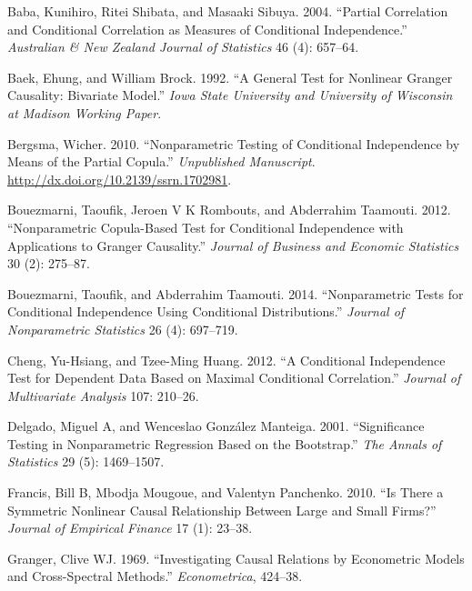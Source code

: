 \documentclass[
  12pt,
  letterpaper]{article}
\newlength{\cslhangindent}
\newenvironment{cslreferences}%
  {\setlength{\parindent}{0pt}%
  \everypar{\setlength{\hangindent}{\cslhangindent}}\ignorespaces}%
  {\par}
\theoremstyle{definition}
\theoremstyle{definition}
\theoremstyle{definition}
\theoremstyle{remark}
\begin{document}
\hypertarget{refs}{}
\begin{cslreferences}
\leavevmode\hypertarget{ref-baba2004partial}{}%
Baba, Kunihiro, Ritei Shibata, and Masaaki Sibuya. 2004. ``Partial Correlation and Conditional Correlation as Measures of Conditional Independence.'' \emph{Australian \& New Zealand Journal of Statistics} 46 (4): 657--64.

\leavevmode\hypertarget{ref-baek:broc:1992}{}%
Baek, Ehung, and William Brock. 1992. ``A General Test for Nonlinear Granger Causality: Bivariate Model.'' \emph{Iowa State University and University of Wisconsin at Madison Working Paper}.

\leavevmode\hypertarget{ref-bergsma2011nonparametric}{}%
Bergsma, Wicher. 2010. ``Nonparametric Testing of Conditional Independence by Means of the Partial Copula.'' \emph{Unpublished Manuscript}. \url{http://dx.doi.org/10.2139/ssrn.1702981}.

\leavevmode\hypertarget{ref-bouezmarni2012nonparametric}{}%
Bouezmarni, Taoufik, Jeroen V K Rombouts, and Abderrahim Taamouti. 2012. ``Nonparametric Copula-Based Test for Conditional Independence with Applications to Granger Causality.'' \emph{Journal of Business and Economic Statistics} 30 (2): 275--87.

\leavevmode\hypertarget{ref-boue:taam:2014}{}%
Bouezmarni, Taoufik, and Abderrahim Taamouti. 2014. ``Nonparametric Tests for Conditional Independence Using Conditional Distributions.'' \emph{Journal of Nonparametric Statistics} 26 (4): 697--719.

\leavevmode\hypertarget{ref-cheng2012conditional}{}%
Cheng, Yu-Hsiang, and Tzee-Ming Huang. 2012. ``A Conditional Independence Test for Dependent Data Based on Maximal Conditional Correlation.'' \emph{Journal of Multivariate Analysis} 107: 210--26.

\leavevmode\hypertarget{ref-delgado2001significance}{}%
Delgado, Miguel A, and Wenceslao González Manteiga. 2001. ``Significance Testing in Nonparametric Regression Based on the Bootstrap.'' \emph{The Annals of Statistics} 29 (5): 1469--1507.

\leavevmode\hypertarget{ref-fran:moug:vale:2010}{}%
Francis, Bill B, Mbodja Mougoue, and Valentyn Panchenko. 2010. ``Is There a Symmetric Nonlinear Causal Relationship Between Large and Small Firms?'' \emph{Journal of Empirical Finance} 17 (1): 23--38.

\leavevmode\hypertarget{ref-granger1969investigating}{}%
Granger, Clive WJ. 1969. ``Investigating Causal Relations by Econometric Models and Cross-Spectral Methods.'' \emph{Econometrica}, 424--38.


\end{cslreferences}
\end{document}
